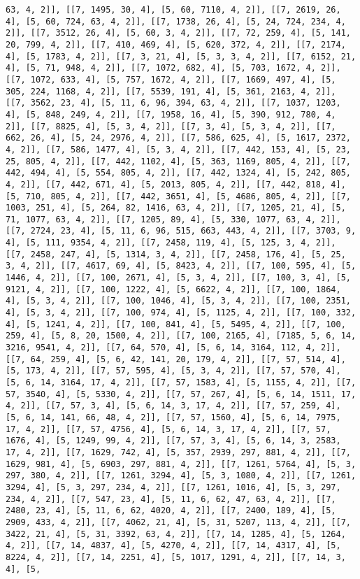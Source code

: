 \documentclass[12pt,fleqn]{article}\usepackage{../../common}
\begin{document}
\begin{verbatim}
63, 4, 2]], [[7, 1495, 30, 4], [5, 60, 7110, 4, 2]], [[7, 2619, 26, 4], [5, 60, 724, 63, 4, 2]], [[7, 1738, 26, 4], [5, 24, 724, 234, 4, 2]], [[7, 3512, 26, 4], [5, 60, 3, 4, 2]], [[7, 72, 259, 4], [5, 141, 20, 799, 4, 2]], [[7, 410, 469, 4], [5, 620, 372, 4, 2]], [[7, 2174, 4], [5, 1783, 4, 2]], [[7, 3, 21, 4], [5, 3, 3, 4, 2]], [[7, 6152, 21, 4], [5, 71, 948, 4, 2]], [[7, 1072, 682, 4], [5, 703, 1672, 4, 2]], [[7, 1072, 633, 4], [5, 757, 1672, 4, 2]], [[7, 1669, 497, 4], [5, 305, 224, 1168, 4, 2]], [[7, 5539, 191, 4], [5, 361, 2163, 4, 2]], [[7, 3562, 23, 4], [5, 11, 6, 96, 394, 63, 4, 2]], [[7, 1037, 1203, 4], [5, 848, 249, 4, 2]], [[7, 1958, 16, 4], [5, 390, 912, 780, 4, 2]], [[7, 8825, 4], [5, 3, 4, 2]], [[7, 3, 4], [5, 3, 4, 2]], [[7, 662, 26, 4], [5, 24, 2976, 4, 2]], [[7, 586, 625, 4], [5, 1617, 2372, 4, 2]], [[7, 586, 1477, 4], [5, 3, 4, 2]], [[7, 442, 153, 4], [5, 23, 25, 805, 4, 2]], [[7, 442, 1102, 4], [5, 363, 1169, 805, 4, 2]], [[7, 442, 494, 4], [5, 554, 805, 4, 2]], [[7, 442, 1324, 4], [5, 242, 805, 4, 2]], [[7, 442, 671, 4], [5, 2013, 805, 4, 2]], [[7, 442, 818, 4], [5, 710, 805, 4, 2]], [[7, 442, 3651, 4], [5, 4686, 805, 4, 2]], [[7, 1003, 251, 4], [5, 264, 82, 1416, 63, 4, 2]], [[7, 1205, 21, 4], [5, 71, 1077, 63, 4, 2]], [[7, 1205, 89, 4], [5, 330, 1077, 63, 4, 2]], [[7, 2724, 23, 4], [5, 11, 6, 96, 515, 663, 443, 4, 2]], [[7, 3703, 9, 4], [5, 111, 9354, 4, 2]], [[7, 2458, 119, 4], [5, 125, 3, 4, 2]], [[7, 2458, 247, 4], [5, 1314, 3, 4, 2]], [[7, 2458, 176, 4], [5, 25, 3, 4, 2]], [[7, 4617, 69, 4], [5, 8423, 4, 2]], [[7, 100, 595, 4], [5, 1446, 4, 2]], [[7, 100, 2671, 4], [5, 3, 4, 2]], [[7, 100, 3, 4], [5, 9121, 4, 2]], [[7, 100, 1222, 4], [5, 6622, 4, 2]], [[7, 100, 1864, 4], [5, 3, 4, 2]], [[7, 100, 1046, 4], [5, 3, 4, 2]], [[7, 100, 2351, 4], [5, 3, 4, 2]], [[7, 100, 974, 4], [5, 1125, 4, 2]], [[7, 100, 332, 4], [5, 1241, 4, 2]], [[7, 100, 841, 4], [5, 5495, 4, 2]], [[7, 100, 259, 4], [5, 8, 20, 1500, 4, 2]], [[7, 100, 2165, 4], [7185, 5, 6, 14, 3216, 9541, 4, 2]], [[7, 64, 570, 4], [5, 6, 14, 3164, 112, 4, 2]], [[7, 64, 259, 4], [5, 6, 42, 141, 20, 179, 4, 2]], [[7, 57, 514, 4], [5, 173, 4, 2]], [[7, 57, 595, 4], [5, 3, 4, 2]], [[7, 57, 570, 4], [5, 6, 14, 3164, 17, 4, 2]], [[7, 57, 1583, 4], [5, 1155, 4, 2]], [[7, 57, 3540, 4], [5, 5330, 4, 2]], [[7, 57, 267, 4], [5, 6, 14, 1511, 17, 4, 2]], [[7, 57, 3, 4], [5, 6, 14, 3, 17, 4, 2]], [[7, 57, 259, 4], [5, 6, 14, 141, 66, 48, 4, 2]], [[7, 57, 1560, 4], [5, 6, 14, 7975, 17, 4, 2]], [[7, 57, 4756, 4], [5, 6, 14, 3, 17, 4, 2]], [[7, 57, 1676, 4], [5, 1249, 99, 4, 2]], [[7, 57, 3, 4], [5, 6, 14, 3, 2583, 17, 4, 2]], [[7, 1629, 742, 4], [5, 357, 2939, 297, 881, 4, 2]], [[7, 1629, 981, 4], [5, 6903, 297, 881, 4, 2]], [[7, 1261, 5764, 4], [5, 3, 297, 380, 4, 2]], [[7, 1261, 3294, 4], [5, 3, 1080, 4, 2]], [[7, 1261, 3294, 4], [5, 3, 297, 234, 4, 2]], [[7, 1261, 1016, 4], [5, 3, 297, 234, 4, 2]], [[7, 547, 23, 4], [5, 11, 6, 62, 47, 63, 4, 2]], [[7, 2480, 23, 4], [5, 11, 6, 62, 4020, 4, 2]], [[7, 2400, 189, 4], [5, 2909, 433, 4, 2]], [[7, 4062, 21, 4], [5, 31, 5207, 113, 4, 2]], [[7, 3422, 21, 4], [5, 31, 3392, 63, 4, 2]], [[7, 14, 1285, 4], [5, 1264, 4, 2]], [[7, 14, 4837, 4], [5, 4270, 4, 2]], [[7, 14, 4317, 4], [5, 8224, 4, 2]], [[7, 14, 2251, 4], [5, 1017, 1291, 4, 2]], [[7, 14, 3, 4], [5, 
\end{verbatim}
\end{document}
